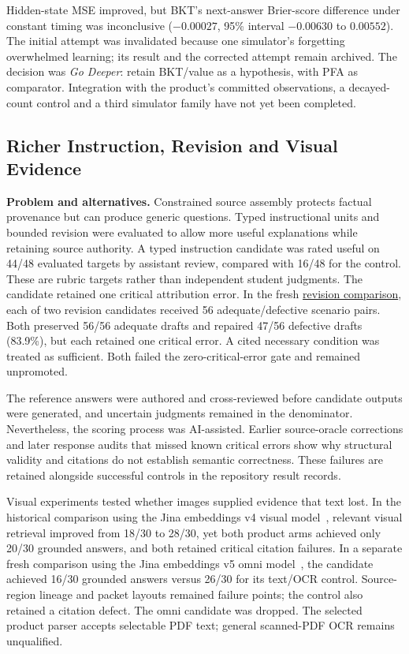 Hidden-state MSE improved, but BKT's next-answer Brier-score difference under
constant timing was inconclusive ($-0.00027$, 95\% interval $-0.00630$ to
$0.00552$). The initial attempt was invalidated because one
simulator's forgetting overwhelmed learning; its result and the corrected
attempt remain archived. The decision was \emph{Go Deeper}: retain BKT/value
as a hypothesis, with PFA as comparator. Integration with the product's
committed observations, a decayed-count control and a third simulator family
have not yet been completed. 

\subsection{Richer Instruction, Revision and Visual Evidence}
\textbf{Problem and alternatives.}
Constrained source assembly protects factual provenance but can produce generic
questions. Typed instructional units and bounded revision were evaluated to
allow more useful explanations while retaining source authority. A typed
instruction candidate was rated useful on 44/48 evaluated targets by assistant
review, compared with 16/48 for the control. These are rubric targets rather
than independent student judgments. The candidate retained one critical
attribution error. In the fresh \hyperref[study-F]{revision comparison}, each of two revision candidates received
56 adequate/defective scenario pairs. Both preserved 56/56 adequate drafts
and repaired 47/56 defective drafts (83.9\%), but each retained one critical
error. A cited necessary condition was treated as sufficient. Both failed
the zero-critical-error gate and remained unpromoted.

The reference answers were authored and cross-reviewed before candidate outputs were generated, and
uncertain judgments remained in the denominator. Nevertheless, the scoring
process was AI-assisted. Earlier source-oracle corrections and later response
audits that missed known critical errors show why structural validity and
citations do not establish semantic correctness. These failures are retained
alongside successful controls in the repository result records.

Visual experiments tested whether images supplied evidence that text lost.
In the historical comparison using the Jina embeddings v4 visual model~\cite{jina4-card}, relevant visual retrieval
improved from 18/30 to 28/30, yet both product arms achieved only 20/30 grounded
answers, and both retained critical citation failures. In a separate fresh comparison using the Jina embeddings v5 omni model~\cite{jina5-card},
the candidate achieved 16/30 grounded answers versus 26/30 for its text/OCR
control. Source-region lineage and packet layouts remained failure points;
the control also retained a citation defect. The omni candidate was dropped.
The selected product parser accepts selectable PDF text; general scanned-PDF
OCR remains unqualified.

